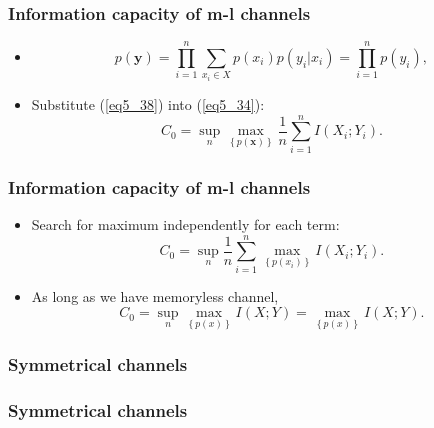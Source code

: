 \documentclass[14pt]{beamer}
\renewcommand{\vec}[1]{\ensuremath{\boldsymbol{#1}}}
\begin{document}
\begin{frame}
\frametitle{Information capacity of m-l channels}
\begin{itemize}

    \item 
    \[
    p({\vec y}) = \prod\limits_{i = 1}^n {\sum\limits_{x_i \in X} {p(x_i
    )p(y_i \vert x_i )} } = \prod\limits_{i = 1}^n {p(y_i )} ,
    \]
    

    \item Substitute (\ref{eq5_38}) into (\ref{eq5_34}):
    \[
    C_0 = \mathop {\sup }\limits_n \mathop {\max }%
    \limits_{\left\{ {p({\vec x})} \right\}} \frac{1}{n}\sum\limits_{i =
    1}^n I (X_i ;Y_i ).
    \]
    
\end{itemize}
\end{frame}



\begin{frame}
\frametitle{Information capacity of m-l channels}
\begin{itemize}
     
    \item Search for maximum independently for each term:
    \[
    C_0 = \mathop {\sup }\limits_n \frac{1}{n}\sum\limits_{i = 1}^n {\mathop
    {\max }\limits_{\left\{ {p(x_i )} \right\}} I} (X_i ;Y_i ).
    \]


    \item As long as we have memoryless channel, 
    \[
    C_0 = \mathop {\sup }\limits_n \mathop {\max }\limits_{\left\{ {p(x)}
    \right\}} I(X;Y) = \mathop {\max }\limits_{\left\{ {p(x)} \right\}} I(X;Y).
    \]
    \QED

\end{itemize}
\end{frame}


\begin{frame}
\frametitle{Symmetrical channels}
\begin{itemize}

    

\end{itemize}
\end{frame}


\begin{frame}
\frametitle{Symmetrical channels}
\begin{itemize}

\end{itemize}
\end{frame}
\end{document}
